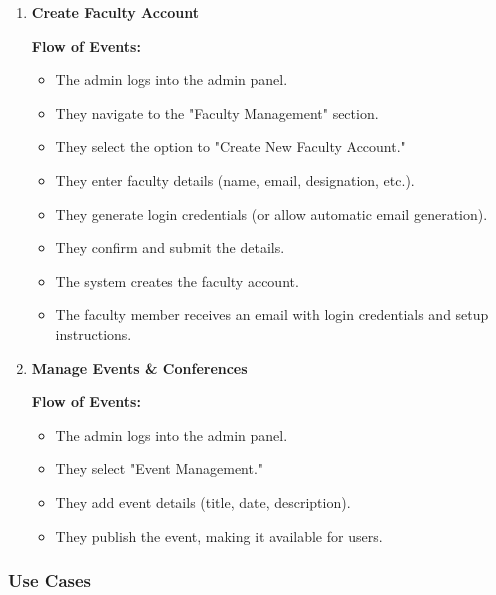 \documentclass[11pt]{article}
\begin{document}
\begin{enumerate}
\begin{enumerate}
        \item \textbf{Create Faculty Account} \par
    \textbf{Flow of Events:}
        \begin{itemize}
            \item The admin logs into the admin panel.
            \item They navigate to the "Faculty Management" section.
            \item They select the option to "Create New Faculty Account."
            \item They enter faculty details (name, email, designation, etc.).
            \item They generate login credentials (or allow automatic email generation).
            \item They confirm and submit the details.
            \item The system creates the faculty account.
            \item The faculty member receives an email with login credentials and setup instructions.
        \end{itemize}

        \item \textbf{Manage Events \& Conferences} \par
    \textbf{Flow of Events:}
        \begin{itemize}
            \item The admin logs into the admin panel.
            \item They select "Event Management."
            \item They add event details (title, date, description).
            \item They publish the event, making it available for users.
        \end{itemize}
    \end{enumerate}
\end{enumerate}

\subsubsection{Use Cases}
\renewcommand{\arraystretch}{2}
\noindent
\end{document}
